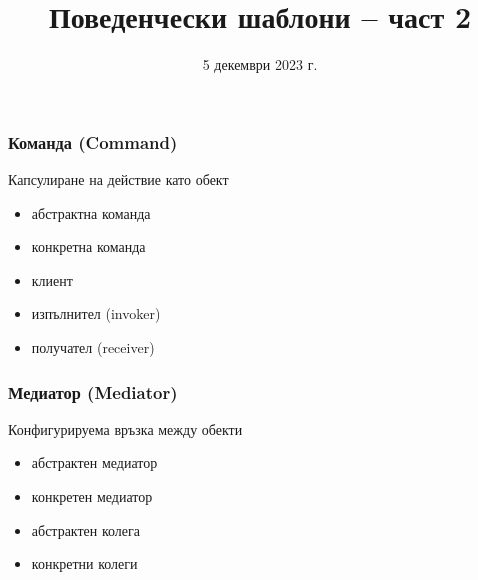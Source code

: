 \documentclass[alsotrans]{beamerswitch}
\title{Поведенчески  шаблони -- част 2}
\date{5 декември 2023 г.}
\begin{document}
\begin{frame}
  \titlepage
\end{frame}

\begin{frame}
  \frametitle{Команда (Command)}

  \begin{purpose}
    Капсулиране на действие като обект
  \end{purpose}

  \pause
  \vspace{2ex}
  \comps
  \begin{itemize}[<+->]
  \item абстрактна команда
  \item конкретна команда
  \item клиент
  \item изпълнител (invoker)
  \item получател (receiver)
  \end{itemize}
\end{frame}

\begin{frame}
  \frametitle{Медиатор (Mediator)}

  \begin{purpose}
    Конфигурируема връзка между обекти
  \end{purpose}

  \pause
  \vspace{2ex}
  \comps
  \begin{itemize}[<+->]
  \item абстрактен медиатор
  \item конкретен медиатор
  \item абстрактен колега
  \item конкретни колеги
  \end{itemize}
\end{frame}
\end{document}
